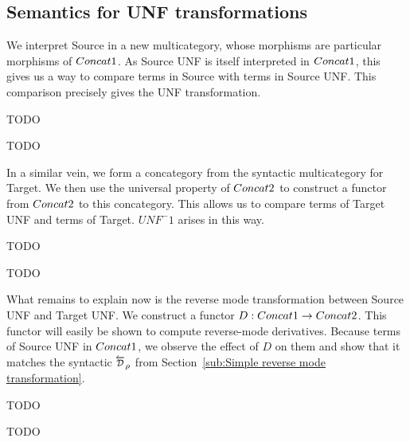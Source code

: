 \subsection{Semantics for UNF transformations} %
\label{sub:Semantics for UNF transformations}

We interpret Source in a new multicategory, 
whose morphisms are particular morphisms of $Concat1$.
As Source UNF is itself interpreted in $Concat1$, 
this gives us a way to compare terms in Source with terms in Source UNF.
This comparison precisely gives the UNF transformation.

\begin{definition}
    TODO
\end{definition}

\begin{proposition}
    TODO
\end{proposition}

In a similar vein, we form a concategory from the syntactic multicategory for Target.
We then use the universal property of $Concat2$ to construct a functor from $Concat2$ to this concategory.
This allows us to compare terms of Target UNF and terms of Target. 
$UNF^-1$ arises in this way.

\begin{definition}
    TODO
\end{definition}

\begin{proposition}
    TODO
\end{proposition}

What remains to explain now is the reverse mode transformation between Source UNF and Target UNF.
We construct a functor $D:Concat1\to Concat2$. 
This functor will easily be shown to compute reverse-mode derivatives.
Because terms of Source UNF in $Concat1$, we observe the effect of $D$ on them
and show that it matches the syntactic $\Dsynrevsymbol_{\rho}$ 
from Section~\ref{sub:Simple reverse mode transformation}.

\begin{definition}
    TODO
\end{definition}

\begin{proposition}
    TODO
\end{proposition}


